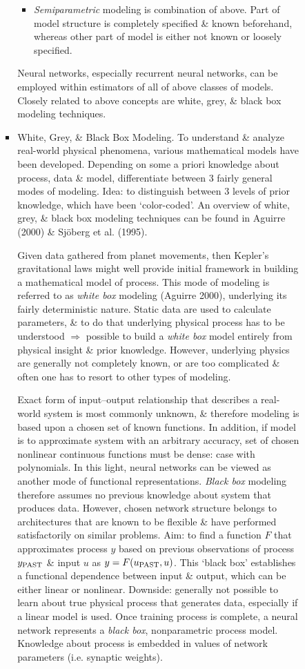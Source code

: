 \documentclass{article}
\begin{document}
\begin{enumerate}
\begin{itemize}
\begin{itemize}
\begin{itemize}
\begin{itemize}
					\item {\it Semiparametric} modeling is combination of above. Part of model structure is completely specified \& known beforehand, whereas other part of model is either not known or loosely specified.
				\end{itemize}
				Neural networks, especially recurrent neural networks, can be employed within estimators of all of above classes of models. Closely related to above concepts are white, grey, \& black box modeling techniques.
				\item {\sf White, Grey, \& Black Box Modeling.} To understand \& analyze real-world physical phenomena, various mathematical models have been developed. Depending on some a priori knowledge about process, data \& model, differentiate between 3 fairly general modes of modeling. Idea: to distinguish between 3 levels of prior knowledge, which have been `color-coded'. An overview of white, grey, \& black box modeling techniques can be found in Aguirre (2000) \& Sjöberg et al. (1995).
				
				Given data gathered from planet movements, then Kepler's gravitational laws might well provide initial framework in building a mathematical model of process. This mode of modeling is referred to as {\it white box} modeling (Aguirre 2000), underlying its fairly deterministic nature. Static data are used to calculate parameters, \& to do that underlying physical process has to be understood $\Rightarrow$ possible to build a {\it white box} model entirely from physical insight \& prior knowledge. However, underlying physics are generally not completely known, or are too complicated \& often one has to resort to other types of modeling.
				
				Exact form of input--output relationship that describes a real-world system is most commonly unknown, \& therefore modeling is based upon a chosen set of known functions. In addition, if model is to approximate system with an arbitrary accuracy, set of chosen nonlinear continuous functions must be dense: case with polynomials. In this light, neural networks can be viewed as another mode of functional representations. {\it Black box} modeling therefore assumes no previous knowledge about system that produces data. However, chosen network structure belongs to architectures that are known to be flexible \& have performed satisfactorily on similar problems. Aim: to find a function $F$ that approximates process $y$ based on previous observations of process $y_{\rm PAST}$ \& input $u$ as $y = F(u_{\rm PAST},u)$. This `black box' establishes a functional dependence between input \& output, which can be either linear or nonlinear. Downside: generally not possible to learn about true physical process that generates data, especially if a linear model is used. Once training process is complete, a neural network represents a {\it black box}, nonparametric process model. Knowledge about process is embedded in values of network parameters (i.e. synaptic weights).
				

\end{itemize}
\end{itemize}
\end{itemize}
\end{enumerate}
\end{document}
